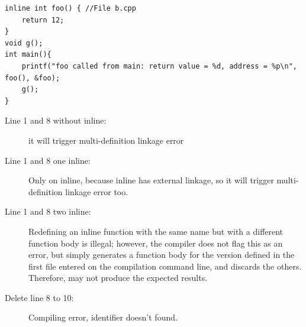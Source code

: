 \documentclass[a4paper,11pt,twoside]{book}
\begin{document}
\begin{itemize}
\begin{lstlisting}
inline int foo() { //File b.cpp
	return 12;
}
void g();
int main(){
	printf("foo called from main: return value = %d, address = %p\n", foo(), &foo);
	g();
}
\end{lstlisting} 
\begin{description}
	\item[Line 1 and 8 without inline:] it will trigger multi-definition linkage error
	\item[Line 1 and 8 one inline:] Only on inline, because inline has external linkage, so it will trigger multi-definition linkage error too.
	\item[Line 1 and 8 two inline:] Redefining an inline function with the same name but with a different function body is illegal; however, the compiler does not flag this as an error, but simply generates a function body for the version defined in the first file entered on the compilation command line, and discards the others. Therefore, may not produce the expected results.
	\item[Delete line 8 to 10:] Compiling error, identifier doesn't found.	
\end{description}

		
\end{itemize}
\end{document}
